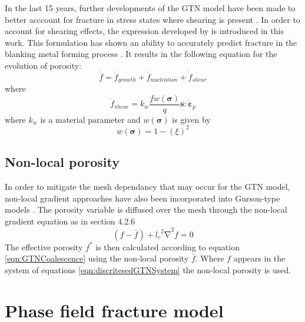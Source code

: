 \documentclass[sn-mathphys,Numbered,draft]{sn-jnl}%
\begin{document}
In the last 15 years, further developments of the GTN model have been made to better acccount for fracture in stress states where shearing is present \cite{nahshon_modification_2008,malcher_continuum_2012,leclerc_micromechanics-based_2020,achouri_numerical_2013}.
In order to account for shearing effects, the expression developed by \citet{nahshon_modification_2008} is introduced in this work. This formulation has shown an ability to accurately predict fracture in the blanking metal forming process \cite{achouri_numerical_2013}. It results in the following equation for the evolution of porosity:
\begin{equation}
	\dot{f}={\dot{f}}_{growth}+{\dot{f}}_{nucleation}+{\dot{f}}_{shear}	
\end{equation}
where
\begin{equation}
	{\dot{f}}_{shear}=k_w\frac{fw\left(\boldsymbol{\sigma}\right)}{q}\mathbf{s}:{\dot{\boldsymbol{\varepsilon}}}_p	
\end{equation}
where $k_w$ is a material parameter and $w(\boldsymbol{\sigma})$ is given by
\begin{equation}
	w\left(\boldsymbol{\sigma}\right)=1-\left(\xi\right)^2	
\end{equation}

\subsection{Non-local porosity}

In order to mitigate the mesh dependancy that may occur for the GTN model, non-local gradient approaches have also been incorporated into Gurson-type models \cite{reusch_non-local_2003,leclerc_micromechanics-based_2020}.
The porosity variable is diffused over the mesh through the non-local gradient equation as in section 4.2.6 
\begin{equation}
	\left(f-\bar{f}\right)+{{l_c}^2\mathrm{\nabla}}^2f=0
\end{equation}
  The effective porosity $f^\ast$ is then calculated according to equation \ref{eqn:GTNCoalescence} using the non-local porosity $\bar{f}$. Where $f$ appears in the system of equations \ref{eqn:discritesedGTNSystem} the non-local porosity is used.
 
\section{Phase field fracture model}
\end{document}
